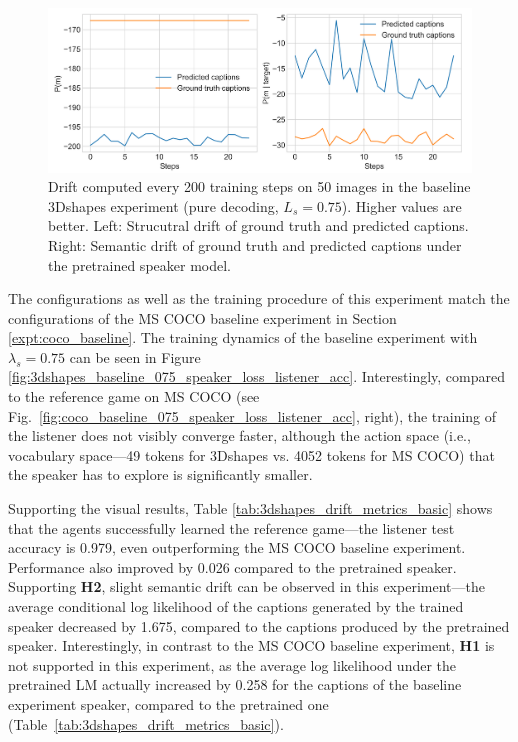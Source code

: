 \begin{figure}
	\centering
	\includegraphics[width=\linewidth]{images/3dshapes_structural_semantic_drift_49_pure_075_random.png}
	\caption{Drift computed every 200 training steps on 50 images in the baseline 3Dshapes experiment (pure decoding, $L_s = 0.75$). Higher values are better. Left: Strucutral drift of ground truth and predicted captions. Right: Semantic drift of ground truth and predicted captions under the pretrained speaker model.} 
	\label{fig:3dshapes_baseline_075_str_drift}
\end{figure}

The configurations as well as the training procedure of this experiment match the configurations of the MS COCO baseline experiment in Section \ref{expt:coco_baseline}. The training dynamics of the baseline experiment with $\lambda_s = 0.75$ can be seen in Figure \ref{fig:3dshapes_baseline_075_speaker_loss_listener_acc}. Interestingly, compared to the reference game on MS COCO (see Fig.~\ref{fig:coco_baseline_075_speaker_loss_listener_acc}, right), the training of the listener does not visibly converge faster, although the action space (i.e., vocabulary space---49 tokens for 3Dshapes vs. 4052 tokens for MS COCO) that the speaker has to explore is significantly smaller. 
 
Supporting the visual results, Table \ref{tab:3dshapes_drift_metrics_basic} shows that the agents successfully learned the reference game---the listener test accuracy is 0.979, even outperforming the MS COCO baseline experiment. Performance also improved by 0.026 compared to the pretrained speaker. 
Supporting \textbf{H2}, slight semantic drift can be observed in this experiment---the average conditional log likelihood of the captions generated by the trained speaker decreased by 1.675, compared to the captions produced by the pretrained speaker. Interestingly, in contrast to the MS COCO baseline experiment, \textbf{H1} is not supported in this experiment, as the average log likelihood under the pretrained LM actually increased by 0.258 for the captions of the baseline experiment speaker, compared to the pretrained one (Table~\ref{tab:3dshapes_drift_metrics_basic}).
 
